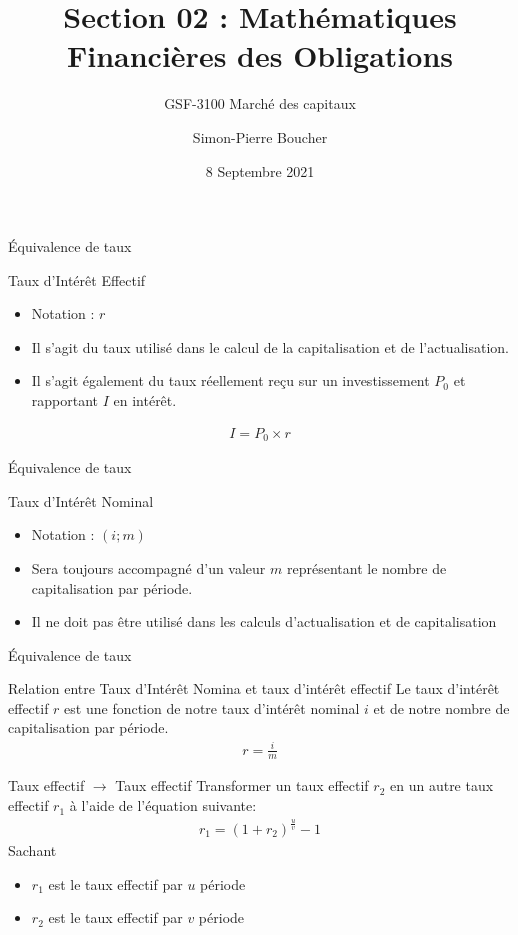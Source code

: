 \documentclass{beamer}
\title[S02 Mathématique]{Section 02 : Mathématiques Financières des Obligations}
\subtitle{GSF-3100 Marché des capitaux}
\author[SP. Boucher]{Simon-Pierre Boucher\inst{1}}
\institute[Université Laval]
{
  \inst{1}%
  Département de finance, assurance et immobilier\\
  Faculté des sciences de l'administration\\
  Université Laval}
\date[Automne 2021]{8 Septembre 2021}
\begin{document}
\begin{frame}
\titlepage
\end{frame}


\begin{frame}{Équivalence de taux}
\begin{block}{Taux d'Intérêt Effectif}
\begin{itemize}
\item Notation : $r$
\item Il s'agit du taux utilisé dans le calcul de la capitalisation et de l'actualisation. 
\item Il s'agit également du taux réellement reçu sur un investissement $P_0$ et rapportant $I$ en intérêt.
\end{itemize}
\begin{align*}
I=P_0 \times r
\end{align*}
\end{block}
\end{frame}


\begin{frame}{Équivalence de taux}
\begin{block}{Taux d'Intérêt Nominal}
\begin{itemize}
\item Notation : $(i;m)$
\item Sera toujours accompagné d'un valeur $m$ représentant le nombre de capitalisation par période.
\item Il ne doit pas être utilisé dans les calculs d’actualisation et de capitalisation
\end{itemize}
\end{block}
\end{frame}


\begin{frame}{Équivalence de taux}
\begin{block}{Relation entre Taux d'Intérêt Nomina et taux d'intérêt effectif}
Le taux d'intérêt effectif $r$ est une fonction de notre taux d'intérêt nominal $i$ et de notre nombre de capitalisation par période. 
\begin{align*}
r=\frac{i}{m}
\end{align*}
\end{block}
\end{frame}

\begin{frame}{Taux effectif $\rightarrow$ Taux effectif}
Transformer un taux effectif $r_2$ en un autre taux effectif $r_1$ à l'aide de l'équation suivante:
\begin{align*}
r_1 =(1+r_2)^{\frac{u}{v}}-1
\end{align*}
Sachant 
\begin{itemize}
\item $r_1$ est le taux effectif par $u$ période 
\item $r_2$ est le taux effectif par $v$ période 
\end{itemize}
\end{frame}
\end{document}

